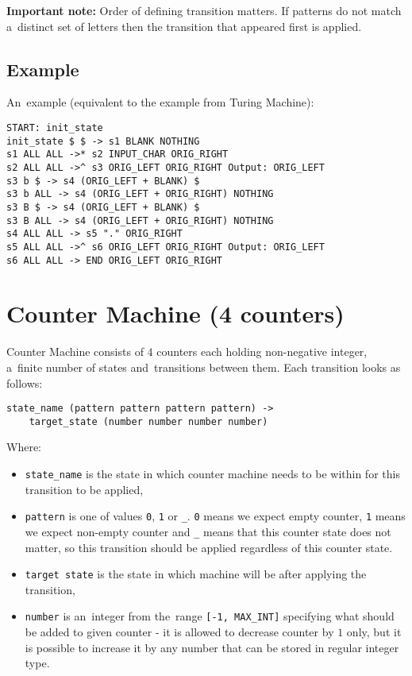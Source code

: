 \documentclass[english,shortabstract,mgr]{iithesis}
\begin{document}
\textbf{Important note:} Order of defining transition matters. If patterns do not match
a~distinct set of letters then the transition that appeared first is applied.

\subsection{Example}

An~example (equivalent to the example from Turing Machine):
\begin{verbatim}
START: init_state
init_state $ $ -> s1 BLANK NOTHING
s1 ALL ALL ->* s2 INPUT_CHAR ORIG_RIGHT
s2 ALL ALL ->^ s3 ORIG_LEFT ORIG_RIGHT Output: ORIG_LEFT
s3 b $ -> s4 (ORIG_LEFT + BLANK) $
s3 b ALL -> s4 (ORIG_LEFT + ORIG_RIGHT) NOTHING
s3 B $ -> s4 (ORIG_LEFT + BLANK) $
s3 B ALL -> s4 (ORIG_LEFT + ORIG_RIGHT) NOTHING
s4 ALL ALL -> s5 "." ORIG_RIGHT
s5 ALL ALL ->^ s6 ORIG_LEFT ORIG_RIGHT Output: ORIG_LEFT
s6 ALL ALL -> END ORIG_LEFT ORIG_RIGHT
\end{verbatim}

\section {Counter Machine (4 counters)}

Counter Machine consists of $4$ counters each holding non-negative integer,
a~finite number of states and~transitions between them. Each transition
looks as follows:

\begin{verbatim}
state_name (pattern pattern pattern pattern) ->
    target_state (number number number number)
\end{verbatim}

Where:
\begin{itemize}
  \item \texttt{state\_name} is the state in which counter machine needs to be
      within for this transition to be applied,
  \item \texttt{pattern} is one of values \texttt{0}, \texttt{1} or \texttt{\_}.
      \texttt{0} means we expect empty counter, \texttt{1} means we expect non-empty
      counter and \texttt{\_} means that this counter state does not matter, so
      this transition should be applied regardless of this counter state.
  \item \texttt{target state} is the state in which machine will be after
      applying the transition,
  \item \texttt{number} is an~integer from the~range \texttt{[-1, MAX\_INT]} specifying
      what should be added to given counter - it is allowed to decrease counter
      by $1$ only, but it is possible to increase it by any number that can be stored
      in regular integer type.
\end{itemize}
\end{document}
